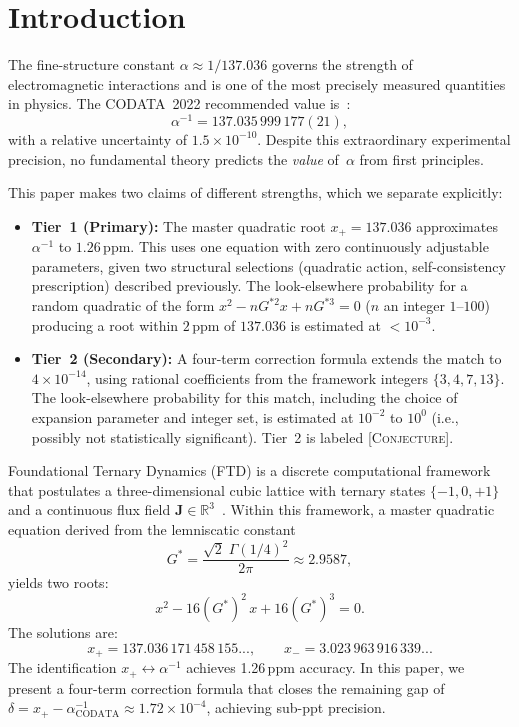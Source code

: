 \documentclass[11pt,twoside]{article}
\theoremstyle{remark}
\newcommand{\etag}[1]{\textsc{\small[#1]}}
\newcommand{\conj}{\etag{Conjecture}}
\newcommand{\Gstar}{G^{*}}
\newcommand{\xp}{x_{+}}
\newcommand{\xm}{x_{-}}
\newcommand{\inv}{\alpha^{-1}}
\begin{document}
\section{Introduction}
\label{sec:intro}

The fine-structure constant $\alpha \approx 1/137.036$ governs the strength of electromagnetic interactions and is one of the most precisely measured quantities in physics.
The CODATA~2022 recommended value is~\cite{CODATA2022}:
\begin{equation}
\label{eq:codata}
    \inv = 137.035\,999\,177(21),
\end{equation}
with a relative uncertainty of $1.5 \times 10^{-10}$.
Despite this extraordinary experimental precision, no fundamental theory predicts the \emph{value} of~$\alpha$ from first principles.

This paper makes two claims of different strengths, which we separate explicitly:
\begin{itemize}[nosep]
    \item \textbf{Tier~1 (Primary):} The master quadratic root $\xp = 137.036$ approximates $\inv$ to $1.26$\,ppm. This uses one equation with zero continuously adjustable parameters, given two structural selections (quadratic action, self-consistency prescription) described previously. The look-elsewhere probability for a random quadratic of the form $x^2 - nG^{*2}x + nG^{*3} = 0$ ($n$ an integer $1$--$100$) producing a root within $2$\,ppm of $137.036$ is estimated at $< 10^{-3}$.
    \item \textbf{Tier~2 (Secondary):} A four-term correction formula extends the match to $4 \times 10^{-14}$, using rational coefficients from the framework integers $\{3, 4, 7, 13\}$. The look-elsewhere probability for this match, including the choice of expansion parameter and integer set, is estimated at $10^{-2}$ to $10^{0}$ (i.e., possibly not statistically significant). Tier~2 is labeled \conj.
\end{itemize}

Foundational Ternary Dynamics (FTD) is a discrete computational framework that postulates a three-dimensional cubic lattice with ternary states $\{-1, 0, +1\}$ and a continuous flux field $\mathbf{J} \in \mathbb{R}^3$~\cite{Anon2026}.
Within this framework, a master quadratic equation derived from the lemniscatic constant
\begin{equation}
\label{eq:gstar}
    \Gstar = \frac{\sqrt{2}\;\Gamma(1/4)^2}{2\pi} \approx 2.9587,
\end{equation}
yields two roots:
\begin{equation}
\label{eq:quadratic}
    x^2 - 16(\Gstar)^2\, x + 16(\Gstar)^3 = 0.
\end{equation}
The solutions are:
\begin{equation}
\label{eq:roots}
    \xp = 137.036\,171\,458\,155..., \qquad \xm = 3.023\,963\,916\,339...
\end{equation}
The identification $\xp \leftrightarrow \inv$ achieves 1.26\,ppm accuracy.
In this paper, we present a four-term correction formula that closes the remaining gap of $\delta = \xp - \inv_{\mathrm{CODATA}} \approx 1.72 \times 10^{-4}$, achieving sub-ppt precision.
\end{document}
